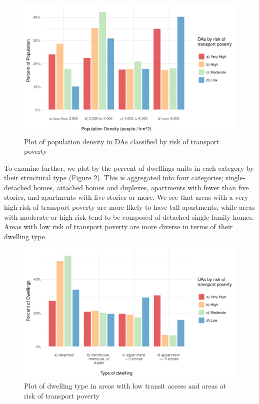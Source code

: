 \documentclass[11 pt, letterpaper]{article}
\begin{document}
{\begin{figure}[H]
	\vspace{4mm}
	\caption{Plot of population density in DAs classified by risk of transport poverty} 
	\label{built_popdense}
	\centerline{\includegraphics[width=6.5in]{figures/built_env/built_popdense.pdf}}
	\vspace{2mm}
\end{figure}

To examine further, we plot by the percent of dwellings units in each category by their structural type (Figure \ref{built_type}). This is aggregated into four categories; single-detached homes, attached homes and duplexes, apartments with fewer than five stories, and apartments with five stories or more. We see that areas with a very high risk of transport poverty are more likely to have tall apartments, while areas with moderate or high risk tend to be composed of detached single-family homes. Areas with low risk of transport poverty are more diverse in terms of their dwelling type. 

\begin{figure}[H]
	\vspace{4mm}
	\caption{Plot of dwelling type in areas with low transit access and areas at risk of transport poverty} 
	\label{built_type}
	\centerline{\includegraphics[width=6.5in]{figures/built_env/built_type.pdf}}
	\vspace{2mm}
\end{figure}

}
\end{document}
